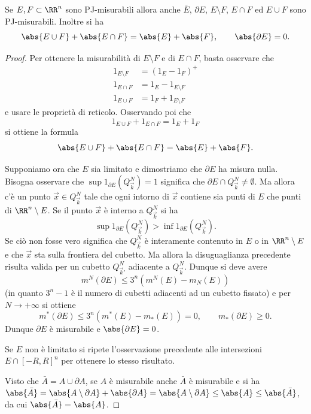 \begin{theorem}
Se $E,F\subset \RR^n$ sono PJ-misurabili allora anche $\bar E$, $\partial E$, 
$E\setminus F$, $E\cap F$ ed $E\cup F$ sono PJ-misurabili.
Inoltre si ha 
\[
    \abs{E\cup F} + \abs{E\cap F} = \abs{E} + \abs{F},
    \qquad
    \abs{\partial E} = 0.
\]
\end{theorem}
\begin{proof}
Per ottenere la misurabilità di $E\setminus F$ e di $E\cap F$, basta osservare che 
\begin{align*}
  1_{E\setminus F} &= (1_E - 1_F)^+\\
  1_{E\cap F} &= 1_E - 1_{E\setminus F}\\
  1_{E\cup F} &= 1_F + 1_{E\setminus F}
\end{align*}
e usare le proprietà di reticolo.
Osservando poi che 
\[
  1_{E\cup F} + 1_{E\cap F} = 1_E + 1_F 
\]
si ottiene la formula
\[
  \abs{E\cup F} + \abs{E\cap F} = \abs{E} + \abs{F}.
\]

Supponiamo ora che $E$ sia limitato
e dimostriamo che $\partial E$ ha misura nulla.
Bisogna osservare 
che $\sup 1_{\partial E}(Q^N_{\vec k}) = 1$ 
significa che $\partial E\cap Q^N_{\vec k} \neq \emptyset$.
Ma allora c'è un punto $\vec x\in Q^N_{\vec k}$ tale che ogni intorno 
di $\vec x$ contiene sia punti di $E$ che punti di $\RR^n\setminus E$.
Se il punto $\vec x$ è interno a $Q^N_{\vec k}$ si ha
\[
  \sup 1_{\partial E}(Q^N_{\vec k}) > \inf 1_{\partial E}(Q^N_{\vec k}).
\]
Se ciò non fosse vero significa che 
$Q^N_{\vec k}$ è interamente contenuto in $E$ o in $\RR^n\setminus E$
e che $\vec x$ sta sulla frontiera del cubetto.
Ma allora la disuguaglianza precedente risulta valida 
per un cubetto $Q^N_{\vec k'}$ adiacente a $Q^N_{\vec k}$.
Dunque si deve avere 
\[
  m^N(\partial E)\le 3^n (m^N(E)-m_N(E))
\]
(in quanto $3^n-1$ è il numero di cubetti adiacenti ad un cubetto fissato)
e per $N\to +\infty$ si ottiene 
\[
  m^*(\partial E) \le 3^n (m^*(E)-m_*(E)) = 0, 
  \qquad 
  m_*(\partial E)\ge 0.
\]
Dunque $\partial E$ è misurabile e $\abs{\partial E} = 0$.

Se $E$ non è limitato si ripete l'osservazione precedente alle intersezioni 
$E\cap [-R,R]^n$ per ottenere lo stesso risultato.

Visto che $\bar A = A \cup \partial A$, se $A$ è misurabile anche $\bar A$ è 
misurabile e si ha $\abs{\bar A} = \abs{A\setminus \partial A} + \abs{\partial A}
= \abs{A \setminus \partial A} \le \abs{A} \le \abs{\bar A}$,
da cui $\abs{\bar A}=\abs{A}$.
\end{proof}


